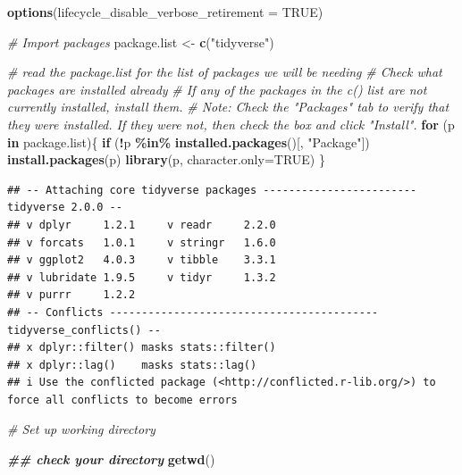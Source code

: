 \documentclass[
]{article}
\newenvironment{Shaded}{\begin{snugshade}}{\end{snugshade}}
\newcommand{\AttributeTok}[1]{\textcolor[rgb]{0.13,0.29,0.53}{#1}}
\newcommand{\CommentTok}[1]{\textcolor[rgb]{0.56,0.35,0.01}{\textit{#1}}}
\newcommand{\ConstantTok}[1]{\textcolor[rgb]{0.56,0.35,0.01}{#1}}
\newcommand{\ControlFlowTok}[1]{\textcolor[rgb]{0.13,0.29,0.53}{\textbf{#1}}}
\newcommand{\DocumentationTok}[1]{\textcolor[rgb]{0.56,0.35,0.01}{\textbf{\textit{#1}}}}
\newcommand{\FunctionTok}[1]{\textcolor[rgb]{0.13,0.29,0.53}{\textbf{#1}}}
\newcommand{\NormalTok}[1]{#1}
\newcommand{\OtherTok}[1]{\textcolor[rgb]{0.56,0.35,0.01}{#1}}
\newcommand{\SpecialCharTok}[1]{\textcolor[rgb]{0.81,0.36,0.00}{\textbf{#1}}}
\newcommand{\StringTok}[1]{\textcolor[rgb]{0.31,0.60,0.02}{#1}}
\begin{document}
\begin{Shaded}
\begin{Highlighting}[]
\FunctionTok{options}\NormalTok{(}\AttributeTok{lifecycle\_disable\_verbose\_retirement =} \ConstantTok{TRUE}\NormalTok{)}
\end{Highlighting}
\end{Shaded}

\begin{Shaded}
\begin{Highlighting}[]
\CommentTok{\# Import packages}
\NormalTok{package.list }\OtherTok{\textless{}{-}} \FunctionTok{c}\NormalTok{(}\StringTok{"tidyverse"}\NormalTok{)}

\CommentTok{\# read the \textasciigrave{}package.list\textasciigrave{} for the list of packages we will be needing}
\CommentTok{\# Check what packages are installed already}
\CommentTok{\# If any of the packages in the c() list are not currently installed, install them.}
\CommentTok{\# Note: Check the "Packages" tab to verify that they were installed. If they were not, then check the box and click "Install".}
\ControlFlowTok{for}\NormalTok{ (p }\ControlFlowTok{in}\NormalTok{ package.list)\{}
  \ControlFlowTok{if}\NormalTok{ (}\SpecialCharTok{!}\NormalTok{p }\SpecialCharTok{\%in\%} \FunctionTok{installed.packages}\NormalTok{()[, }\StringTok{"Package"}\NormalTok{]) }\FunctionTok{install.packages}\NormalTok{(p)}
  \FunctionTok{library}\NormalTok{(p, }\AttributeTok{character.only=}\ConstantTok{TRUE}\NormalTok{)}
\NormalTok{\}}
\end{Highlighting}
\end{Shaded}

\begin{verbatim}
## -- Attaching core tidyverse packages ------------------------ tidyverse 2.0.0 --
## v dplyr     1.2.1     v readr     2.2.0
## v forcats   1.0.1     v stringr   1.6.0
## v ggplot2   4.0.3     v tibble    3.3.1
## v lubridate 1.9.5     v tidyr     1.3.2
## v purrr     1.2.2     
## -- Conflicts ------------------------------------------ tidyverse_conflicts() --
## x dplyr::filter() masks stats::filter()
## x dplyr::lag()    masks stats::lag()
## i Use the conflicted package (<http://conflicted.r-lib.org/>) to force all conflicts to become errors
\end{verbatim}

\begin{Shaded}
\begin{Highlighting}[]
\CommentTok{\# Set up working directory}

\DocumentationTok{\#\# check your directory}
\FunctionTok{getwd}\NormalTok{()}
\end{Highlighting}
\end{Shaded}
\end{document}

